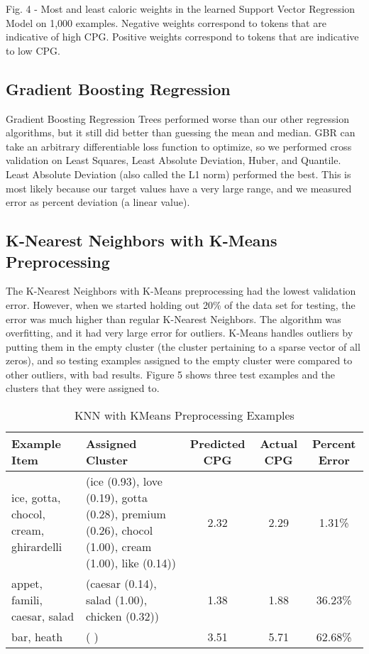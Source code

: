 \documentclass{article}
\begin{document}
Fig. 4 - Most and least caloric weights in the learned Support Vector Regression Model on 1,000 examples. Negative weights correspond to tokens that are indicative of high CPG. Positive weights correspond to tokens that are indicative to low CPG.

\subsection{Gradient Boosting Regression}
Gradient Boosting Regression Trees performed worse than our other regression algorithms, but it still did better than guessing the mean and median. GBR can take an arbitrary differentiable loss function to optimize, so we performed cross validation on Least Squares, Least Absolute Deviation, Huber, and Quantile. Least Absolute Deviation (also called the L1 norm) performed the best. This is most likely because our target values have a very large range, and we measured error as percent deviation (a linear value).

\subsection{K-Nearest Neighbors with K-Means Preprocessing}
The K-Nearest Neighbors with K-Means preprocessing had the lowest validation error. However, when we started holding out 20\% of the data set for testing, the error was much higher than regular K-Nearest Neighbors. The algorithm was overfitting, and it had very large error for outliers. K-Means handles outliers by putting them in the empty cluster (the cluster pertaining to a sparse vector of all zeros), and so testing examples assigned to the empty cluster were compared to other outliers, with bad results. Figure 5 shows three test examples and the clusters that they were assigned to.

\begin{table}[ht]
\caption{KNN with KMeans Preprocessing Examples} %
\centering %
\begin{tabular}{|p{4cm}|p{4cm}|c|c|c|} %
\hline\hline %
Example Item & Assigned Cluster & Predicted CPG & Actual CPG & Percent Error \\ [0.5ex]
\hline %
ice, gotta, chocol, cream, ghirardelli & (ice (0.93), love (0.19), gotta (0.28), premium (0.26), chocol (1.00), cream (1.00), like (0.14)) & 2.32 & 2.29 & 1.31\% \\ [1ex] %
\hline
appet, famili, caesar, salad & (caesar (0.14), salad (1.00), chicken (0.32)) & 1.38 & 1.88 & 36.23\% \\ [1ex]
\hline
bar, heath & ( ) & 3.51 & 5.71 & 62.68\% \\ [1ex] %
\hline %
\end{tabular}
\label{table:nonlin} %
\end{table}
\end{document}
